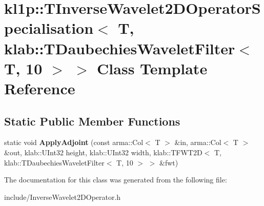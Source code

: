 \hypertarget{classkl1p_1_1TInverseWavelet2DOperatorSpecialisation_3_01T_00_01klab_1_1TDaubechiesWaveletFilter_3_01T_00_0110_01_4_01_4}{}\section{kl1p\+:\+:T\+Inverse\+Wavelet2\+D\+Operator\+Specialisation$<$ T, klab\+:\+:T\+Daubechies\+Wavelet\+Filter$<$ T, 10 $>$ $>$ Class Template Reference}
\label{classkl1p_1_1TInverseWavelet2DOperatorSpecialisation_3_01T_00_01klab_1_1TDaubechiesWaveletFilter_3_01T_00_0110_01_4_01_4}
\subsection*{Static Public Member Functions}
\begin{DoxyCompactItemize}
\item 
static void {\bfseries Apply\+Adjoint} (const arma\+::\+Col$<$ T $>$ \&in, arma\+::\+Col$<$ T $>$ \&out, klab\+::\+U\+Int32 height, klab\+::\+U\+Int32 width, klab\+::\+T\+F\+W\+T2D$<$ T, klab\+::\+T\+Daubechies\+Wavelet\+Filter$<$ T, 10 $>$ $>$ \&fwt)\hypertarget{classkl1p_1_1TInverseWavelet2DOperatorSpecialisation_3_01T_00_01klab_1_1TDaubechiesWaveletFilter_3_01T_00_0110_01_4_01_4_aa3ab2fb0ddd9d02e5fc91aff9d6d2e81}{}\label{classkl1p_1_1TInverseWavelet2DOperatorSpecialisation_3_01T_00_01klab_1_1TDaubechiesWaveletFilter_3_01T_00_0110_01_4_01_4_aa3ab2fb0ddd9d02e5fc91aff9d6d2e81}

\end{DoxyCompactItemize}


The documentation for this class was generated from the following file\+:\begin{DoxyCompactItemize}
\item 
include/Inverse\+Wavelet2\+D\+Operator.\+h\end{DoxyCompactItemize}
